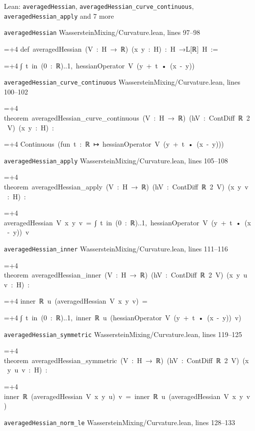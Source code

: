 \documentclass[11pt,a4paper]{report}
\newlength{\leancharwidth}
\newenvironment{leancode}{\par\smallskip\begingroup\ttfamily\footnotesize\raggedright
  \settowidth{\leancharwidth}{M}\setlength{\parskip}{0pt}\setlength{\parindent}{0pt}
  \frenchspacing}{\par\endgroup\smallskip}
\newcommand{\leanline}[2]{\hangindent=\dimexpr#1\leancharwidth+4\leancharwidth\relax
  \hangafter=1\noindent\hspace*{#1\leancharwidth}#2\par}
\newcommand{\leansource}[1]{\par{\footnotesize\color{leanmuted}#1}\par}
\begin{document}
\begin{leanbox}{Lean: \texttt{averagedHessian}, \texttt{averagedHessian\_\allowbreak{}curve\_\allowbreak{}continuous}, \texttt{averagedHessian\_\allowbreak{}apply} and 7 more}
\leansource{\texttt{averagedHessian} \quad WassersteinMixing/\allowbreak{}Curvature.lean, lines 97–98}
\begin{leancode}
\leanline{0}{def\ averagedHessian\ (V\ :\ H\ →\ ℝ)\ (x\ y\ :\ H)\ :\ H\ →L[ℝ]\ H\ :=}
\leanline{2}{∫\ t\ in\ (0\ :\ ℝ)..1,\ hessianOperator\ V\ (y\ +\ t\ •\ (x\ -\ y))}
\end{leancode}
\leansource{\texttt{averagedHessian\_\allowbreak{}curve\_\allowbreak{}continuous} \quad WassersteinMixing/\allowbreak{}Curvature.lean, lines 100–102}
\begin{leancode}
\leanline{0}{theorem\ averagedHessian\_curve\_continuous\ (V\ :\ H\ →\ ℝ)\ (hV\ :\ ContDiff\ ℝ\ 2\ V)\ (x\ y\ :\ H)\ :}
\leanline{4}{Continuous\ (fun\ t\ :\ ℝ\ ↦\ hessianOperator\ V\ (y\ +\ t\ •\ (x\ -\ y)))}
\end{leancode}
\leansource{\texttt{averagedHessian\_\allowbreak{}apply} \quad WassersteinMixing/\allowbreak{}Curvature.lean, lines 105–108}
\begin{leancode}
\leanline{0}{theorem\ averagedHessian\_apply\ (V\ :\ H\ →\ ℝ)\ (hV\ :\ ContDiff\ ℝ\ 2\ V)\ (x\ y\ v\ :\ H)\ :}
\leanline{4}{averagedHessian\ V\ x\ y\ v\ =\ ∫\ t\ in\ (0\ :\ ℝ)..1,\ hessianOperator\ V\ (y\ +\ t\ •\ (x\ -\ y))\ v}
\end{leancode}
\leansource{\texttt{averagedHessian\_\allowbreak{}inner} \quad WassersteinMixing/\allowbreak{}Curvature.lean, lines 111–116}
\begin{leancode}
\leanline{0}{theorem\ averagedHessian\_inner\ (V\ :\ H\ →\ ℝ)\ (hV\ :\ ContDiff\ ℝ\ 2\ V)\ (x\ y\ u\ v\ :\ H)\ :}
\leanline{4}{inner\ ℝ\ u\ (averagedHessian\ V\ x\ y\ v)\ =}
\leanline{6}{∫\ t\ in\ (0\ :\ ℝ)..1,\ inner\ ℝ\ u\ (hessianOperator\ V\ (y\ +\ t\ •\ (x\ -\ y))\ v)}
\end{leancode}
\leansource{\texttt{averagedHessian\_\allowbreak{}symmetric} \quad WassersteinMixing/\allowbreak{}Curvature.lean, lines 119–125}
\begin{leancode}
\leanline{0}{theorem\ averagedHessian\_symmetric\ (V\ :\ H\ →\ ℝ)\ (hV\ :\ ContDiff\ ℝ\ 2\ V)\ (x\ y\ u\ v\ :\ H)\ :}
\leanline{4}{inner\ ℝ\ (averagedHessian\ V\ x\ y\ u)\ v\ =\ inner\ ℝ\ u\ (averagedHessian\ V\ x\ y\ v)}
\end{leancode}
\leansource{\texttt{averagedHessian\_\allowbreak{}norm\_\allowbreak{}le} \quad WassersteinMixing/\allowbreak{}Curvature.lean, lines 128–133}

\end{leanbox}
\end{document}
